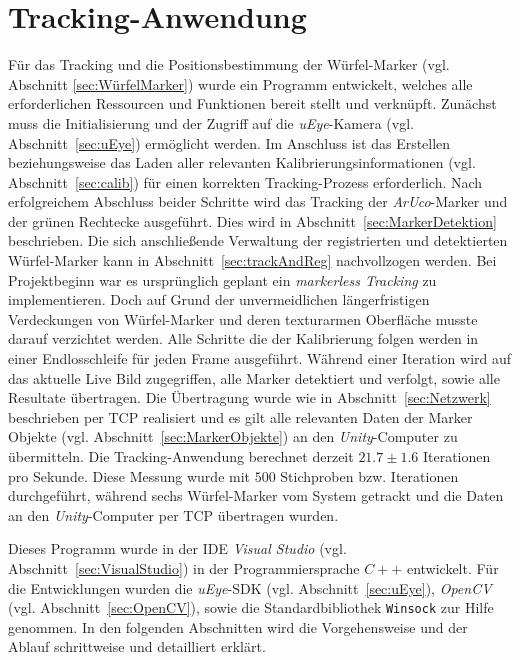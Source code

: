 \section{Tracking-Anwendung}\label{sec:Tracking}%
Für das Tracking und die Positionsbestimmung der Würfel-Marker (vgl. Abschnitt \ref{sec:WürfelMarker}) wurde ein Programm entwickelt, welches alle erforderlichen Ressourcen und Funktionen bereit stellt und verknüpft. Zunächst muss die Initialisierung und der Zugriff auf die \textit{uEye}-Kamera (vgl. Abschnitt~\ref{sec:uEye}) ermöglicht werden. Im Anschluss ist das Erstellen beziehungsweise das Laden aller relevanten Kalibrierungsinformationen (vgl. Abschnitt~\ref{sec:calib}) für einen korrekten Tracking-Prozess erforderlich. Nach erfolgreichem Abschluss beider Schritte wird das Tracking der \textit{ArUco}-Marker und der grünen Rechtecke ausgeführt. Dies wird in Abschnitt~\ref{sec:MarkerDetektion} beschrieben. Die sich anschließende Verwaltung der registrierten und detektierten Würfel-Marker kann in Abschnitt~\ref{sec:trackAndReg} nachvollzogen werden. Bei Projektbeginn war es ursprünglich geplant ein \textit{markerless Tracking} zu implementieren. Doch auf Grund der unvermeidlichen längerfristigen Verdeckungen von Würfel-Marker und deren texturarmen Oberfläche musste darauf verzichtet werden.
Alle Schritte die der Kalibrierung folgen werden in einer Endlosschleife für jeden Frame ausgeführt. Während einer Iteration wird auf das aktuelle Live Bild zugegriffen, alle Marker detektiert und verfolgt, sowie alle Resultate übertragen. Die Übertragung wurde wie in Abschnitt~\ref{sec:Netzwerk} beschrieben per TCP realisiert und es gilt alle relevanten Daten der Marker Objekte (vgl. Abschnitt~\ref{sec:MarkerObjekte}) an den \textit{Unity}-Computer zu übermitteln. Die  Tracking-Anwendung berechnet derzeit $21.7\pm1.6$ Iterationen pro Sekunde. Diese Messung wurde mit $500$ Stichproben bzw. Iterationen durchgeführt, während sechs Würfel-Marker vom System getrackt und die Daten an den \textit{Unity}-Computer per TCP übertragen wurden.

Dieses Programm wurde in der IDE \textit{Visual Studio} (vgl. Abschnitt~\ref{sec:VisualStudio}) in der Programmiersprache $C++$ entwickelt. Für die Entwicklungen wurden die \textit{uEye}-SDK (vgl. Abschnitt~\ref{sec:uEye}), \textit{OpenCV} (vgl. Abschnitt~\ref{sec:OpenCV}), sowie die Standardbibliothek \texttt{Winsock} zur Hilfe genommen. In den folgenden Abschnitten wird die Vorgehensweise und der Ablauf schrittweise und detailliert erklärt.

